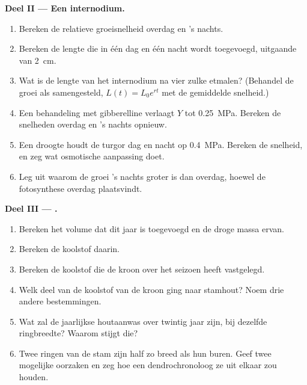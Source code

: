 \begin{problem}
\medskip
\noindent\textbf{Deel II --- Een internodium.}
\begin{enumerate}[resume]
  \item Bereken de relatieve groeisnelheid overdag en 's nachts.
  \item Bereken de lengte die in één dag en één nacht wordt toegevoegd,
        uitgaande van \qty{2}{cm}.
  \item Wat is de lengte van het internodium na vier zulke etmalen?
        (Behandel de groei als samengesteld, $L(t) = L_0 e^{rt}$ met de
        gemiddelde snelheid.)
  \item Een behandeling met gibberelline verlaagt $Y$ tot \qty{0.25}{MPa}.
        Bereken de snelheden overdag en 's nachts opnieuw.
  \item Een droogte houdt de turgor dag en nacht op \qty{0.4}{MPa}.
        Bereken de snelheid, en zeg wat osmotische aanpassing doet.
  \item Leg uit waarom de groei 's nachts groter is dan overdag, hoewel de
        fotosynthese overdag plaatsvindt.
\end{enumerate}

\medskip
\noindent\textbf{Deel III --- .}
\begin{enumerate}[resume]
  \item Bereken het volume  dat dit jaar is toegevoegd en de droge massa
        ervan.
  \item Bereken de koolstof daarin.
  \item Bereken de koolstof die de kroon over het seizoen heeft vastgelegd.
  \item Welk deel van de koolstof van de kroon ging naar stamhout? Noem
        drie andere bestemmingen.
  \item Wat zal de jaarlijkse houtaanwas over twintig jaar zijn, bij
        dezelfde ringbreedte? Waarom stijgt die?
  \item Twee ringen van de stam zijn half zo breed als hun buren. Geef twee
        mogelijke oorzaken en zeg hoe een dendrochronoloog ze uit elkaar zou
        houden.
\end{enumerate}


\end{problem}
